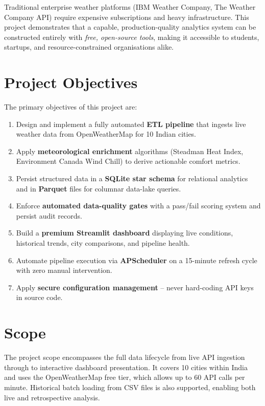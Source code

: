 \documentclass[12pt,a4paper]{report}
\begin{document}
Traditional enterprise weather platforms (IBM Weather Company, The Weather Company API) require expensive subscriptions and heavy infrastructure. This project demonstrates that a capable, production-quality analytics system can be constructed entirely with \textit{free, open-source tools}, making it accessible to students, startups, and resource-constrained organisations alike.

\section{Project Objectives}

The primary objectives of this project are:

\begin{enumerate}[leftmargin=*, label=\arabic*.]
  \item Design and implement a fully automated \textbf{ETL pipeline} that ingests live weather data from OpenWeatherMap for 10 Indian cities.
  \item Apply \textbf{meteorological enrichment} algorithms (Steadman Heat Index, Environment Canada Wind Chill) to derive actionable comfort metrics.
  \item Persist structured data in a \textbf{SQLite star schema} for relational analytics and in \textbf{Parquet} files for columnar data-lake queries.
  \item Enforce \textbf{automated data-quality gates} with a pass/fail scoring system and persist audit records.
  \item Build a \textbf{premium Streamlit dashboard} displaying live conditions, historical trends, city comparisons, and pipeline health.
  \item Automate pipeline execution via \textbf{APScheduler} on a 15-minute refresh cycle with zero manual intervention.
  \item Apply \textbf{secure configuration management} -- never hard-coding API keys in source code.
\end{enumerate}

\section{Scope}

The project scope encompasses the full data lifecycle from live API ingestion through to interactive dashboard presentation. It covers 10 cities within India and uses the OpenWeatherMap free tier, which allows up to 60 API calls per minute. Historical batch loading from CSV files is also supported, enabling both live and retrospective analysis.
\end{document}
